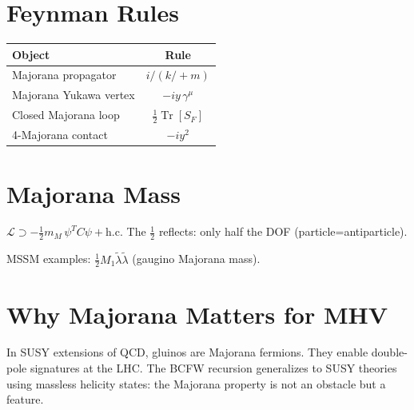 \documentclass[12pt]{article}
\DeclareMathOperator\Tr{Tr}
\begin{document}
\section{Feynman Rules}
\begin{center}
\begin{tabular}{|l|c|}
\hline
Object & Rule \\
\hline
Majorana propagator & $i/(k\!\!\!/+m)$ \\
Majorana Yukawa vertex & $-iy\,\gamma^\mu$ \\
Closed Majorana loop & $\frac12\Tr[S_F]$ \\
4-Majorana contact & $-iy^2$ \\
\hline
\end{tabular}
\end{center}

\section{Majorana Mass}
$\mathcal{L}\supset -\tfrac12 m_M\,\psi^TC\psi + \text{h.c.}$
The $\tfrac12$ reflects: only half the DOF (particle=antiparticle).

MSSM examples: $\tfrac12 M_1\tilde\lambda\tilde\lambda$ (gaugino Majorana mass).

\section{Why Majorana Matters for MHV}
In SUSY extensions of QCD, gluinos are Majorana fermions.
They enable double-pole signatures at the LHC.
The BCFW recursion generalizes to SUSY theories using massless
helicity states: the Majorana property is not an obstacle but a feature.

\vfill
\end{document}

